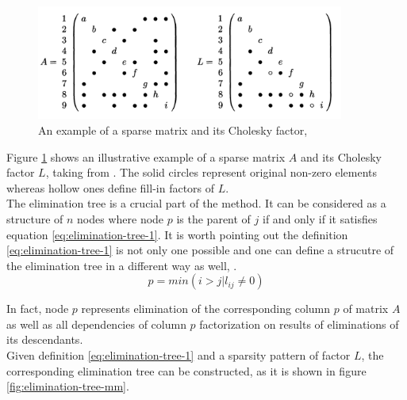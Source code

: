 \begin{figure}[htpb]
  \centering
  \includegraphics[width=0.9\textwidth]{figures/chapter-2/sparsity-pattern-example-mm.png}
\caption{An example of a sparse matrix and its Cholesky factor, \cite{mult-frontal-original:2}}
\label{fig:sparsity-pattern-example-mm}
\end{figure}


Figure \ref{fig:sparsity-pattern-example-mm} shows an illustrative example of a sparse matrix $A$ and its Cholesky factor $L$, taking from \cite{mult-frontal-original:2}. The solid circles represent original non-zero elements whereas hollow ones define fill-in factors of $L$. \\


The elimination tree is a crucial part of the method. It can be considered as a structure of $n$ nodes where node $p$ is the parent of $j$ if and only if it satisfies equation \ref{eq:elimination-tree-1}. It is worth pointing out the definition \ref{eq:elimination-tree-1} is not only one possible and one can define a strucutre of the elimination tree in a different way as well, \cite{mult-frontal-original:2}.\\%

\begin{equation} \label{eq:elimination-tree-1}
	p = min(i > j | l_{ij} \neq 0)
\end{equation}


In fact, node $p$ represents elimination of the corresponding column $p$ of matrix $A$ as well as all dependencies of column $p$ factorization on results of eliminations of its descendants.\\


Given definition \ref{eq:elimination-tree-1} and a sparsity pattern of factor $L$, the corresponding elimination tree can be constructed, as it is shown in figure \ref{fig:elimination-tree-mm}.\\



